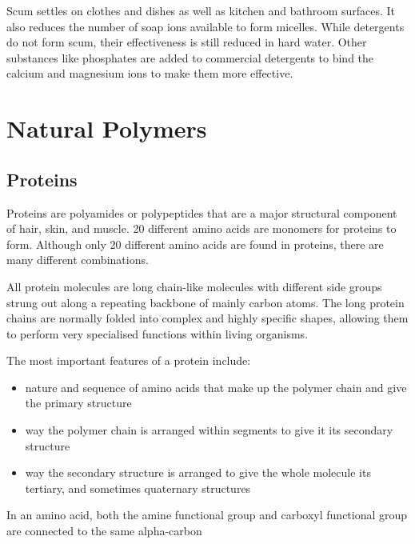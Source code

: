 		\begin{center}
		\end{center}
	
		Scum settles on clothes and dishes as well as kitchen and bathroom surfaces. It also reduces the number of soap ions available to form micelles. While detergents do not form scum, their effectiveness is still reduced in hard water. Other substances like phosphates are added to commercial detergents to bind the calcium and magnesium ions to make them more effective.

\section{Natural Polymers}

	\subsection{Proteins}
	
		Proteins are polyamides or polypeptides that are a major structural component of hair, skin, and muscle. 20 different amino acids are monomers for proteins to form. Although only 20 different amino acids are found in proteins, there are many different combinations.

		All protein molecules are long chain-like molecules with different side groups strung out along a repeating backbone of mainly carbon atoms. The long protein chains are normally folded into complex and highly specific shapes, allowing them to perform very specialised functions within living organisms.

		The most important features of a protein include:

			\begin{itemize}
				\item nature and sequence of amino acids that make up the polymer chain and give the primary structure
				\item way the polymer chain is arranged within segments to give it its secondary structure
				\item way the secondary structure is arranged to give the whole molecule its tertiary, and sometimes quaternary structures
			\end{itemize}

		In an amino acid, both the amine functional group and carboxyl functional group are connected to the same alpha-carbon

		\begin{center}
		\end{center}


